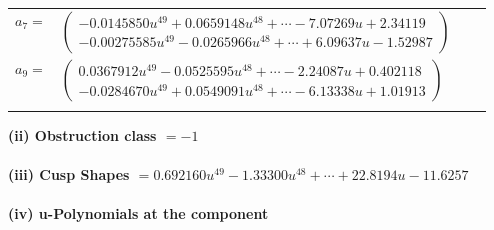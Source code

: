 \documentclass[1p]{elsarticle_modified}
\theoremstyle{definition}
\begin{document}
\begin{tabular}{m{7pt} m{180pt} m{7pt} m{180pt} }
\flushright $a_{7}=$&$\begin{pmatrix}-0.0145850 u^{49}+0.0659148 u^{48}+\cdots-7.07269 u+2.34119\\-0.00275585 u^{49}-0.0265966 u^{48}+\cdots+6.09637 u-1.52987\end{pmatrix}$ \\
\flushright $a_{9}=$&$\begin{pmatrix}0.0367912 u^{49}-0.0525595 u^{48}+\cdots-2.24087 u+0.402118\\-0.0284670 u^{49}+0.0549091 u^{48}+\cdots-6.13338 u+1.01913\end{pmatrix}$\\&\end{tabular}
\flushleft \textbf{(ii) Obstruction class $= -1$}\\~\\
\flushleft \textbf{(iii) Cusp Shapes $= 0.692160 u^{49}-1.33300 u^{48}+\cdots+22.8194 u-11.6257$}\\~\\
\newpage\renewcommand{\arraystretch}{1}
\flushleft \textbf{(iv) u-Polynomials at the component}\newline \\
\end{document}
